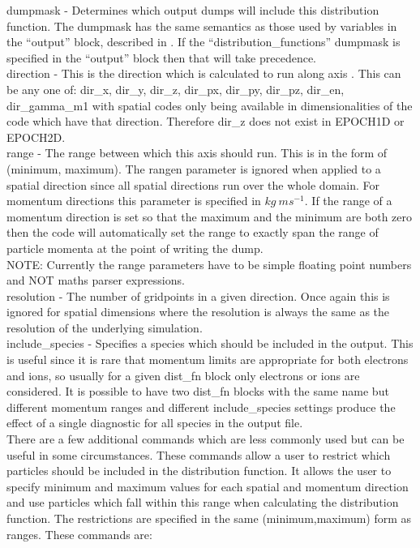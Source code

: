 {\emphtext dumpmask} - Determines which output dumps will include this
distribution function. The dumpmask has the same semantics as those used
by variables in the ``output'' block, described in .
If the ``distribution\_functions'' dumpmask is specified in the ``output''
block then that will take precedence.\\

{\emphtext direction} - This is the direction
which is calculated to run along axis . This can be any one of:
dir\_x, dir\_y, dir\_z, dir\_px, dir\_py, dir\_pz, dir\_en, dir\_gamma\_m1
with spatial codes only being available in dimensionalities of the code which
have that direction. Therefore dir\_z does not exist in EPOCH1D or EPOCH2D.\\

{\emphtext range} - The range between which this axis should
run. This is in the form of (minimum, maximum). The rangen parameter is ignored
when applied to a spatial direction since all spatial directions run over
the whole domain. For momentum directions this parameter is specified in
$kg\ ms^{-1}$. If the range of a momentum direction is set so that the maximum
and the minimum are both zero then the code will automatically set the range to
exactly span the range of particle momenta at the point of writing the dump.\\

{\emphtext NOTE: Currently the range parameters have to be simple floating
point numbers and NOT maths parser expressions.}\\

{\emphtext resolution} - The number of gridpoints in a given
direction. Once again this is ignored for spatial dimensions where the
resolution is always the same as the resolution of the underlying simulation.\\

{\emphtext include\_species} - Specifies a species which should be included
in the output. This is useful since it is rare that momentum limits are
appropriate for both electrons and ions, so usually for a given dist\_fn block
only electrons or ions are considered. It is possible to have two dist\_fn
blocks with the same name but different momentum ranges and different
include\_species settings produce the effect of a single diagnostic for
all species in the output file.\\


There are a few additional commands which are less commonly used but can be
useful in some circumstances. These commands allow a user to restrict which
particles should be included in the distribution function.
It allows the user to specify minimum and
maximum values for each spatial and momentum direction and use particles which
fall within this range when calculating the distribution function. The
restrictions are specified in the same (minimum,maximum) form as ranges. These
commands are:\\

